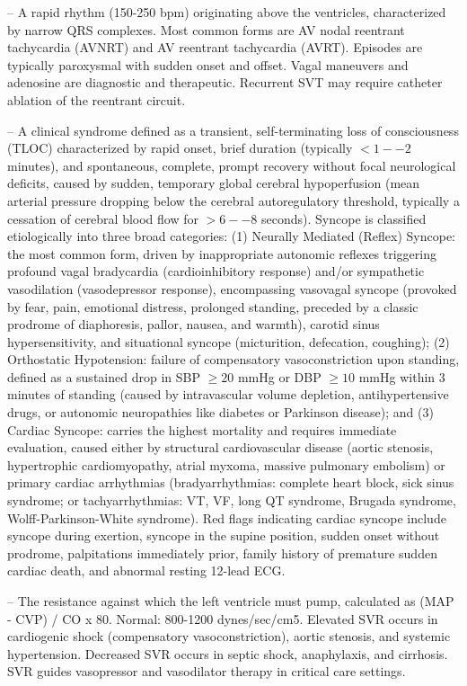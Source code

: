 -- A rapid rhythm (150-250 bpm) originating above the ventricles, characterized by narrow QRS complexes. Most common forms are AV nodal reentrant tachycardia (AVNRT) and AV reentrant tachycardia (AVRT). Episodes are typically paroxysmal with sudden onset and offset. Vagal maneuvers and adenosine are diagnostic and therapeutic. Recurrent SVT may require catheter ablation of the reentrant circuit.

-- A clinical syndrome defined as a transient, self-terminating loss of consciousness (TLOC) characterized by rapid onset, brief duration (typically $<1--2$ minutes), and spontaneous, complete, prompt recovery without focal neurological deficits, caused by sudden, temporary global cerebral hypoperfusion (mean arterial pressure dropping below the cerebral autoregulatory threshold, typically a cessation of cerebral blood flow for $>6--8$ seconds). Syncope is classified etiologically into three broad categories: (1) Neurally Mediated (Reflex) Syncope: the most common form, driven by inappropriate autonomic reflexes triggering profound vagal bradycardia (cardioinhibitory response) and/or sympathetic vasodilation (vasodepressor response), encompassing vasovagal syncope (provoked by fear, pain, emotional distress, prolonged standing, preceded by a classic prodrome of diaphoresis, pallor, nausea, and warmth), carotid sinus hypersensitivity, and situational syncope (micturition, defecation, coughing); (2) Orthostatic Hypotension: failure of compensatory vasoconstriction upon standing, defined as a sustained drop in SBP $\ge 20$ mmHg or DBP $\ge 10$ mmHg within 3 minutes of standing (caused by intravascular volume depletion, antihypertensive drugs, or autonomic neuropathies like diabetes or Parkinson disease); and (3) Cardiac Syncope: carries the highest mortality and requires immediate evaluation, caused either by structural cardiovascular disease (aortic stenosis, hypertrophic cardiomyopathy, atrial myxoma, massive pulmonary embolism) or primary cardiac arrhythmias (bradyarrhythmias: complete heart block, sick sinus syndrome; or tachyarrhythmias: VT, VF, long QT syndrome, Brugada syndrome, Wolff-Parkinson-White syndrome). Red flags indicating cardiac syncope include syncope during exertion, syncope in the supine position, sudden onset without prodrome, palpitations immediately prior, family history of premature sudden cardiac death, and abnormal resting 12-lead ECG.

-- The resistance against which the left ventricle must pump, calculated as (MAP - CVP) / CO x 80. Normal: 800-1200 dynes/sec/cm5. Elevated SVR occurs in cardiogenic shock (compensatory vasoconstriction), aortic stenosis, and systemic hypertension. Decreased SVR occurs in septic shock, anaphylaxis, and cirrhosis. SVR guides vasopressor and vasodilator therapy in critical care settings.

